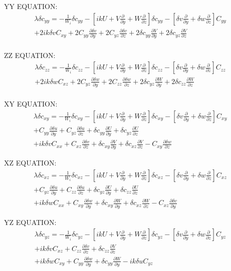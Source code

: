 \documentclass[12,a4paper]{article}
\newcommand{\dy}[1]{\frac{\partial #1}{\partial y}}
\newcommand{\dz}[1]{\frac{\partial #1}{\partial z}}
\newcommand{\scyy}{\delta c_{yy}}
\newcommand{\sczz}{\delta c_{zz}}
\newcommand{\scxy}{\delta c_{xy}}
\newcommand{\scxz}{\delta c_{xz}}
\newcommand{\scyz}{\delta c_{yz}}
\newcommand{\su}{\delta u}
\newcommand{\sv}{\delta v}
\newcommand{\sw}{\delta w}
\newcommand{\Wi}{\frac{1}{W_{i}}}
\newcommand{\first}[2]{-\Wi \delta c_{#1 #2} - \left[ ikU
+ V\frac{\partial}{\partial y} + W\frac{\partial}{\partial z} \right] \delta c_{#1 #2} 
- \left[ \sv\frac{\partial }{\partial y} + \sw\frac{\partial }{\partial z} \right] C_{#1 #2}}
\begin{document}
YY EQUATION:
\begin{multline}
 \lambda \delta c_{yy} = \first{y}{y} \\
+ 2ik\sv C_{xy} + 2C_{yy}\dy{\sv} + 2C_{yz}\dz{\sv} + 2\scyy \dy{V} + 2\scyz \dz{V}\\
\end{multline}

ZZ EQUATION:
\begin{multline}
 \lambda \delta c_{zz} = \first{z}{z} \\
+ 2ik\sw C_{xz} + 2C_{yz}\dy{\sw} + 2C_{zz}\dz{\sw} + 2\scyz \dy{W} + 2\sczz \dz{W}\\
\end{multline}

XY EQUATION:
\begin{multline}
  \lambda \delta c_{xy} = \first{x}{y} \\
 + C_{yy}\dy{\su} + C_{yz}\dz{\su} + \scyy \dy{U} + \scyz \dz{U} \\
 + ik\sv C_{xx} + C_{xz}\dz{\sv} + \scxy \dy{V} + \scxz \dz{V} - C_{xy}\dz{\sw}
\end{multline}

XZ EQUATION:
\begin{multline}
 \lambda \delta c_{xz} = \first{x}{z} \\
+ C_{yz}\dy{\su} + C_{zz}\dz{\su} + \scyz \dy{U} + \sczz \dz{U} \\
+ ik\sw C_{xx} + C_{xy}\dy{\sw} + \scxy \dy{W} + \scxz \dz{W} - C_{xz}\dy{\sv}
\end{multline}

YZ EQUATION:
\begin{multline}
 \lambda \delta c_{yz} = \first{y}{z} \\
+ ik\sv C_{xz} + C_{zz}\dz{\sv} + \sczz \dz{V} \\
+ ik\sw C_{xy} + C_{yy}\dy{\sw} + \scyy \dy{W} - ik\su C_{yz}
\end{multline}
\end{document}
